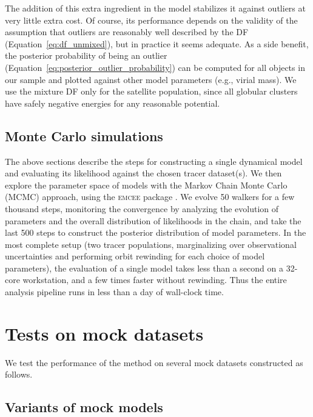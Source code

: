 \documentclass[usenatbib,fleqn]{mnras}
\begin{document}
The addition of this extra ingredient in the model stabilizes it against outliers at very little extra cost. Of course, its performance depends on the validity of the assumption that outliers are reasonably well described by the DF (Equation~\ref{eq:df_unmixed}), but in practice it seems adequate. As a side benefit, the posterior probability of being an outlier (Equation~\ref{eq:posterior_outlier_probability}) can be computed for all objects in our sample and plotted against other model parameters (e.g., virial mass). We use the mixture DF only for the satellite population, since all globular clusters have safely negative energies for any reasonable potential.

\subsection{Monte Carlo simulations}  \label{sec:mcmc}

The above sections describe the steps for constructing a single dynamical model and evaluating its likelihood against the chosen tracer dataset(s). We then explore the parameter space of models with the Markov Chain Monte Carlo (MCMC) approach, using the \textsc{emcee} package \citep{ForemanMackey2013}. We evolve 50 walkers for a few thousand steps, monitoring the convergence by analyzing the evolution of parameters and the overall distribution of likelihoods in the chain, and take the last 500 steps to construct the posterior distribution of model parameters. In the most complete setup (two tracer populations, marginalizing over observational uncertainties and performing orbit rewinding for each choice of model parameters), the evaluation of a single model takes less than a second on a 32-core workstation, and a few times faster without rewinding. Thus the entire analysis pipeline runs in less than a day of wall-clock time.


\section{Tests on mock datasets}  \label{sec:tests}

We test the performance of the method on several mock datasets constructed as follows.

\subsection{Variants of mock models}  \label{sec:mock_variants}
\end{document}

